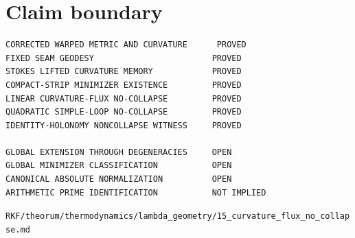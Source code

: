 \hypertarget{claim-boundary}{%
\section{Claim boundary}\label{claim-boundary}}

\begin{verbatim}
CORRECTED WARPED METRIC AND CURVATURE      PROVED
FIXED SEAM GEODESY                        PROVED
STOKES LIFTED CURVATURE MEMORY            PROVED
COMPACT-STRIP MINIMIZER EXISTENCE         PROVED
LINEAR CURVATURE-FLUX NO-COLLAPSE         PROVED
QUADRATIC SIMPLE-LOOP NO-COLLAPSE         PROVED
IDENTITY-HOLONOMY NONCOLLAPSE WITNESS     PROVED

GLOBAL EXTENSION THROUGH DEGENERACIES     OPEN
GLOBAL MINIMIZER CLASSIFICATION           OPEN
CANONICAL ABSOLUTE NORMALIZATION          OPEN
ARITHMETIC PRIME IDENTIFICATION           NOT IMPLIED
\end{verbatim}

\begin{flushright}\small\texttt{RKF/theorum/thermodynamics/lambda\_geometry/15\_curvature\_flux\_no\_collapse.md}\end{flushright}
